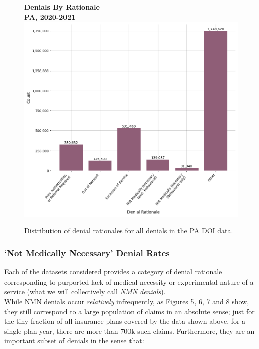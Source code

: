 \documentclass[12pt, a4paper,twoside,parskip=full]{report}
\theoremstyle{plain} %
\theoremstyle{definition} %
\theoremstyle{remark} %
\numberwithin{equation}{chapter}
\begin{document}
		\begin{figure}[h!]
			\centering
			\textbf{Denials By Rationale}\\
			\textbf{PA, 2020-2021}\\
			\includegraphics[width=\columnwidth]{images/pa_claims/denial_rationale_dist_2020-2021.png}
			\caption{Distribution of denial rationales for all denials in the PA DOI data.}
			\label{parationaledist}
		\end{figure}
		
		\subsubsection{`Not Medically Necessary' Denial Rates}
		
		Each of the datasets considered provides a category of denial rationale corresponding to purported lack of medical necessity or experimental nature of a service (what we will collectively call \emph{NMN denials}).\\
		
		While NMN denials occur \emph{relatively} infrequently, as Figures 5, 6, 7 and 8 show, they still correspond to a large population of claims in an absolute sense; just for the tiny fraction of all insurance plans covered by the data shown above, for a single plan year, there are more than 700k such claims. Furthermore, they are an important subset of denials in the sense that:\\
		
\end{document}
